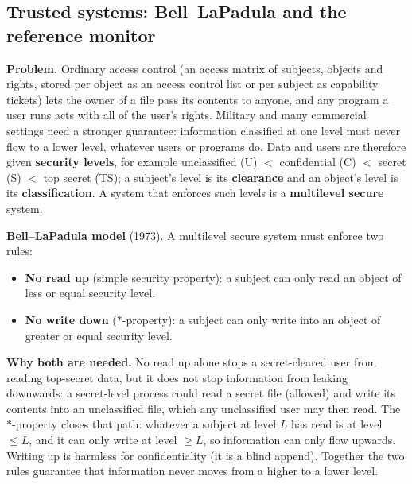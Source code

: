 \subsection{Trusted systems: Bell--LaPadula and the reference monitor \hot\new}

\textbf{Problem.} Ordinary access control (an access matrix of subjects, objects and rights, stored per object as an access control list or per subject as capability tickets) lets the owner of a file pass its contents to anyone, and any program a user runs acts with all of the user's rights. Military and many commercial settings need a stronger guarantee: information classified at one level must never flow to a lower level, whatever users or programs do. Data and users are therefore given \textbf{security levels}, for example unclassified (U) $<$ confidential (C) $<$ secret (S) $<$ top secret (TS); a subject's level is its \textbf{clearance} and an object's level is its \textbf{classification}. A system that enforces such levels is a \textbf{multilevel secure} system.

\textbf{Bell--LaPadula model} (1973). A multilevel secure system must enforce two rules:
\begin{itemize}
  \item \textbf{No read up} (simple security property): a subject can only read an object of less or equal security level.
  \item \textbf{No write down} ($*$-property): a subject can only write into an object of greater or equal security level.
\end{itemize}
\textbf{Why both are needed.} No read up alone stops a secret-cleared user from reading top-secret data, but it does not stop information from leaking downwards: a secret-level process could read a secret file (allowed) and write its contents into an unclassified file, which any unclassified user may then read. The $*$-property closes that path: whatever a subject at level $L$ has read is at level $\le L$, and it can only write at level $\ge L$, so information can only flow upwards. Writing up is harmless for confidentiality (it is a blind append). Together the two rules guarantee that information never moves from a higher to a lower level.


